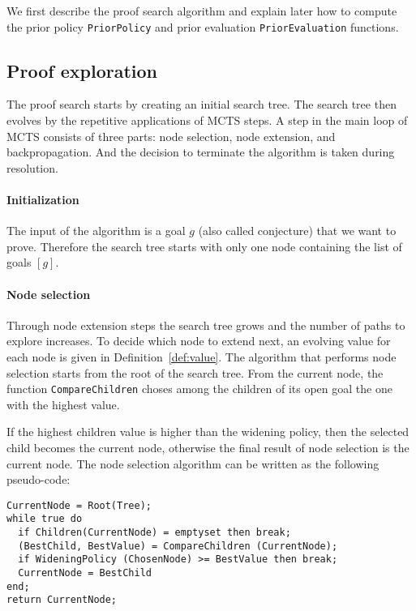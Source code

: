 \documentclass[runningheads,a4paper,draft]{svjour3}
\begin{document}
We first describe the proof search algorithm and explain later how to compute
the prior policy \texttt{PriorPolicy} and prior evaluation
\texttt{PriorEvaluation} functions.

\subsection{Proof exploration}

The proof search starts by creating an initial search tree. The search tree
then evolves by the repetitive applications of MCTS steps. A step in the main
loop of MCTS consists of three parts: node selection, node extension, and
backpropagation. And the decision to terminate the algorithm is taken during
resolution.

\paragraph{Initialization}
The input of the algorithm is a goal $g$ (also called conjecture) that we
want to prove. Therefore the search tree starts with only one node containing
the list of goals
$[g]$.


\paragraph{Node selection}
Through node extension steps the search tree grows and the number of paths to
explore increases. To decide which node to extend next, an evolving value for
each node is given in Definition~\ref{def:value}. The algorithm that performs
node selection starts from the root of the search tree. From the current node,
the function \texttt{CompareChildren} choses among the children of its open
goal the one with the highest value.

If the highest children value is higher than the widening policy, then the
selected child
becomes the current node, otherwise the final result of node selection is the
current node. The node selection algorithm can be written as the following
pseudo-code:

\begin{lstlisting}[language=SMLSmall]
CurrentNode = Root(Tree);
while true do
  if Children(CurrentNode) = emptyset then break;
  (BestChild, BestValue) = CompareChildren (CurrentNode);
  if WideningPolicy (ChosenNode) >= BestValue then break;
  CurrentNode = BestChild
end;
return CurrentNode;
\end{lstlisting}
\end{document}
